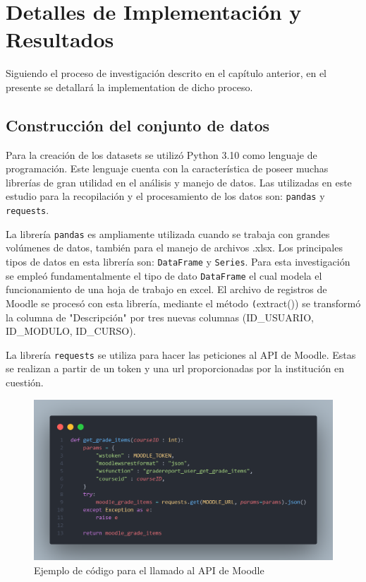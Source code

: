 \chapter{Detalles de Implementación y Resultados}\label{chapter:implementation}

Siguiendo el proceso de investigación descrito en el capítulo anterior, 
en el presente se detallará la implementation de dicho proceso. 

\section{Construcción del conjunto de datos}

Para la creación de los datasets se utilizó Python 3.10 como lenguaje de programación. 
Este lenguaje cuenta con la característica de poseer muchas librerías de gran utilidad en el análisis y manejo de datos. Las utilizadas 
en este estudio para la recopilación y el procesamiento de los datos son: \texttt{pandas} y \texttt{requests}.  

La librería \texttt{pandas} es ampliamente utilizada cuando se trabaja con grandes volúmenes de datos, también para el manejo de archivos .xlsx. 
Los principales tipos de datos en esta librería son: \texttt{DataFrame} y \texttt{Series}. Para esta investigación se empleó fundamentalmente 
el tipo de dato \texttt{DataFrame} el cual modela el funcionamiento de una hoja de trabajo en excel. El archivo de registros de Moodle se procesó con esta librería, 
mediante el método \texttt(extract()) se transformó la columna de "Descripción" por tres nuevas columnas (ID\_USUARIO, ID\_MODULO, ID\_CURSO).  


La librería \texttt{requests} se utiliza para hacer las peticiones al API de Moodle. Estas se realizan a partir de un token y una url proporcionadas por la institución en cuestión.  

\begin{figure}
    \centering
    \includegraphics[width = 1 \textwidth]{Graphics/code.png}
    \caption{Ejemplo de código para el llamado al API de Moodle}
    \label{ApiMoodle}
\end{figure}

